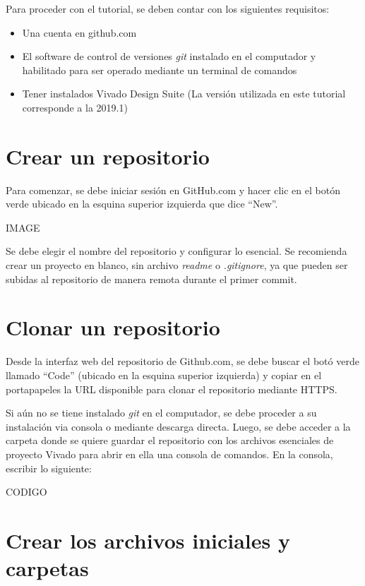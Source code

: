 Para proceder con el tutorial, se deben contar con los siguientes requisitos:
\begin{itemize}
	\item Una cuenta en github.com
	\item El software de control de versiones \textit{git} instalado en el computador y habilitado para ser operado mediante un terminal de comandos
	\item Tener instalados Vivado Design Suite (La versión utilizada en este tutorial corresponde a la 2019.1)
\end{itemize}{

\section{Crear un repositorio}

Para comenzar, se debe iniciar sesión en GitHub.com y hacer clic en el botón verde ubicado en la esquina superior izquierda que dice ``New''.

IMAGE

Se debe elegir el nombre del repositorio y configurar lo esencial. Se recomienda crear un proyecto en blanco, sin archivo \textit{readme} o \textit{.gitignore}, ya que pueden ser subidas al repositorio de manera remota durante el primer commit.

\section{Clonar un repositorio}

Desde la interfaz web del repositorio de Github.com, se debe buscar el botó verde llamado ``Code'' (ubicado en la esquina superior izquierda) y copiar en el portapapeles la URL\textit{} disponible para clonar el repositorio mediante HTTPS.

Si aún no se tiene instalado \textit{git} en el computador, se debe proceder a su instalación via consola o mediante descarga directa. Luego, se debe acceder a la carpeta donde se quiere guardar el repositorio con los archivos esenciales de proyecto Vivado para abrir en ella una consola de comandos. En la consola, escribir lo siguiente:

CODIGO

\section{Crear los archivos iniciales y carpetas}

}
